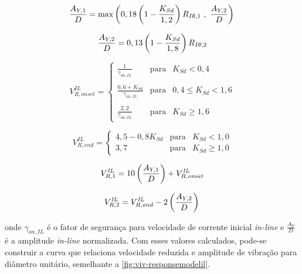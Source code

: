 \begin{equation}
\label{eq:viv-Vronset}
\frac{A_{Y,1}}{D} = \max\left(0,18 \left(1 - \frac{K_\mathit{Sd}}{1,2}\right) R_{I\theta,1} ~,~\frac{A_{Y,2}}{D}\right)\\
\end{equation}

\begin{equation}
\frac{A_{Y,2}}{D} = 0,13 \left(1 - \frac{K_\mathit{Sd}}{1,8}\right) R_{I\theta,2}\\
\end{equation}

\begin{equation}
V_{R,\mathit{onset}}^\mathit{IL} = \left\{
\begin{matrix}
\frac{1}{ \gamma_{\mathit{on}, \mathit{IL}} }                 & \mathrm{para} & K_\mathit{Sd} < 0,4\\
\\
\frac{0,6 + K_\mathit{Sd}}{\gamma_{\mathit{on}, \mathit{IL}}} & \mathrm{para} & 0,4 \leq K_\mathit{Sd} < 1,6 \\
\\
\frac{2,2}{\gamma_{\mathit{on}, \mathit{IL}}}                 & \mathrm{para} & K_\mathit{Sd} \geq 1,6
\end{matrix}
\right.
\end{equation}

\begin{equation}
V_{R, \mathit{end}}^\mathit{IL} = \left\{
\begin{matrix}
4,5 - 0,8 K_\mathit{Sd} & \mathrm{para} & K_\mathit{Sd} < 1,0 \\
3,7                     & \mathrm{para} & K_\mathit{Sd} \geq 1,0 
\end{matrix}
\right.
\end{equation}

\begin{equation}
V_{R, 1}^\mathit{IL} = 10 \left(\frac{A_{Y, 1}}{D}\right)+ V_{R,\mathit{onset}}^\mathit{IL}\\
\end{equation}

\begin{equation}
V_{R, 2}^\mathit{IL} =  V_{R, \mathit{end}}^\mathit{IL} - 2 \left(\frac{A_{Y, 2}}{D}\right)\\
\end{equation}

onde $\gamma_{\mathit{on}, \mathit{IL}}$ é o fator de segurança para velocidade de corrente inicial \textit{in-line} e $\frac{A_Y}{D}$ é a amplitude \textit{in-line} normalizada. Com esses valores calculados, pode-se construir a curva que relaciona velocidade reduzida e amplitude de vibração para diâmetro unitário, semelhante a \autoref{fig:viv-responsemodelil}.

